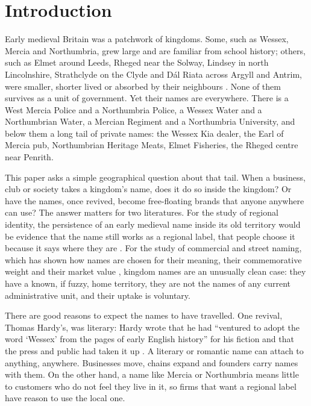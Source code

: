 \documentclass[11pt,a4paper]{article}
\begin{document}
\section{Introduction}
Early medieval Britain was a patchwork of kingdoms. Some, such as Wessex, Mercia and Northumbria, grew large and are familiar from school history; others, such as Elmet around Leeds, Rheged near the Solway, Lindsey in north Lincolnshire, Strathclyde on the Clyde and Dál Riata across Argyll and Antrim, were smaller, shorter lived or absorbed by their neighbours \citep{yorke1990,bassett1989,rollason2003,clarkson2014}. None of them survives as a unit of government. Yet their names are everywhere. There is a West Mercia Police and a Northumbria Police, a Wessex Water and a Northumbrian Water, a Mercian Regiment and a Northumbria University, and below them a long tail of private names: the Wessex Kia dealer, the Earl of Mercia pub, Northumbrian Heritage Meats, Elmet Fisheries, the Rheged centre near Penrith.

This paper asks a simple geographical question about that tail. When a business, club or society takes a kingdom's name, does it do so inside the kingdom? Or have the names, once revived, become free-floating brands that anyone anywhere can use? The answer matters for two literatures. For the study of regional identity, the persistence of an early medieval name inside its old territory would be evidence that the name still works as a regional label, that people choose it because it says where they are \citep{paasi1986,paasi2003}. For the study of commercial and street naming, which has shown how names are chosen for their meaning, their commemorative weight and their market value \citep{roseredwood2010,lightyoung2015}, kingdom names are an unusually clean case: they have a known, if fuzzy, home territory, they are not the names of any current administrative unit, and their uptake is voluntary.

There are good reasons to expect the names to have travelled. One revival, Thomas Hardy's, was literary: Hardy wrote that he had ``ventured to adopt the word `Wessex' from the pages of early English history'' for his fiction and that the press and public had taken it up \citep{hardy1895,gatrell2003}. A literary or romantic name can attach to anything, anywhere. Businesses move, chains expand and founders carry names with them. On the other hand, a name like Mercia or Northumbria means little to customers who do not feel they live in it, so firms that want a regional label have reason to use the local one.
\end{document}
